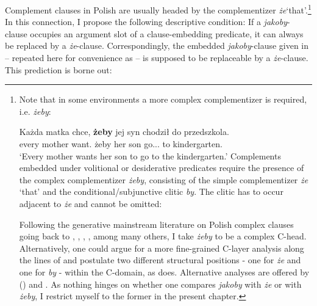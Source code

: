 \documentclass[output=paper]{langsci/langscibook}
\begin{document}
Complement clauses in Polish are usually headed by the complementizer \emph{że}\linebreak `that'.\footnote{Note that in some environments a more complex complementizer is required, i.e. \emph{żeby}:

\ea \gll Każda matka chce, \textbf{żeby} jej syn chodził do przedszkola. \\
		every mother want.{\thirdperson}{\sg} żeby her son go.{\lptcp}.{\sg}.{\masc} to kindergarten.{\gen} \\
\glt	`Every mother wants her son to go to the kindergarten.'
\z
Complements embedded under volitional or desiderative predicates require the presence of the complex complementizer \emph{żeby}, consisting of the simple complementizer \emph{że} `that' and the conditional\slash subjunctive clitic \emph{by}. The clitic has to occur adjacent to \emph{że} and cannot be omitted:

\z
Following the generative mainstream literature on Polish complex clauses going back to \textcite{Tajsner1989}, \textcite{Willim1989}, \textcite{Witkos1998}, \textcite{Bondaruk2004}, among many others, I take \emph{żeby} to be a complex C-head. Alternatively, one could argue for a more fine-grained C-layer analysis along the lines of \textcite{Rizzi1997} and postulate two different structural positions - one for \emph{że} and one for \emph{by} - within the C-domain, as \textcite{Szczegielniak1999} does. Alternative analyses are offered by \citeauthor{Migdalski2016} (\citeyear{Migdalski2006, Migdalski2009, Migdalski2016}) and \textcite{Tomaszewicz2012}. As nothing hinges on whether one compares \emph{jakoby} with \emph{że} or with \emph{żeby}, I restrict myself to the former in the present chapter.
}
In this connection, I propose the following descriptive condition: If a \emph{jakoby}-clause occupies an argument slot of a clause-embedding predicate, it can always be replaced by a \emph{że}-clause. Correspondingly, the embedded \emph{jakoby}-clause  given in  – repeated here for convenience as  – is supposed to be replaceable by a \emph{że}-clause. This prediction is borne out:
\end{document}
